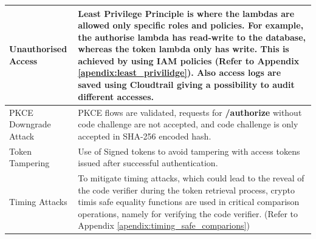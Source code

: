 \begin{longtable}{|p{5cm}|p{10cm}|}
\begin{itemize}
\end{itemize}
\hline
 Unauthorised Access & Least Privilege Principle is where the lambdas are allowed only specific roles and policies. For example, the authorise lambda has read-write to the database, whereas the token lambda only has write. This is achieved by using IAM policies (Refer to Appendix \ref{apendix:least_privilidge}). Also access logs are saved using Cloudtrail giving a possibility to audit different accesses.\\
\hline
PKCE Downgrade Attack & PKCE flows are validated, requests for \textbf{/authorize} without code challenge are not accepted, and code challenge is only accepted in SHA-256 encoded hash. \\
\hline
Token Tampering & Use of Signed tokens to avoid tampering with access tokens issued after successful authentication.  \\
\hline
Timing Attacks & To mitigate timing attacks, which could lead to the reveal of the code verifier during the token retrieval process, crypto timis safe equality functions are used in critical comparison operations, namely for verifying the code verifier. (Refer to Appendix \ref{apendix:timing_safe_comparions})  \\
\hline
\end{longtable}


